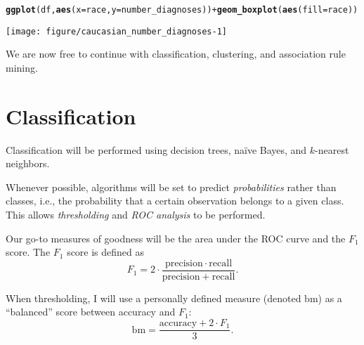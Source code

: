 \documentclass{article}\usepackage[]{graphicx}\usepackage[]{color}
\makeatletter
\def\maxwidth{ %
  \ifdim\Gin@nat@width>\linewidth
    \linewidth
  \else
    \Gin@nat@width
  \fi
}
\newcommand{\hlopt}[1]{\textcolor[rgb]{0,0,0}{#1}}%
\newcommand{\hlstd}[1]{\textcolor[rgb]{0.345,0.345,0.345}{#1}}%
\newcommand{\hlkwc}[1]{\textcolor[rgb]{0.333,0.667,0.333}{#1}}%
\newcommand{\hlkwd}[1]{\textcolor[rgb]{0.737,0.353,0.396}{\textbf{#1}}}%
\newenvironment{kframe}{%
 \def\at@end@of@kframe{}%
 \ifinner\ifhmode%
  \def\at@end@of@kframe{\end{minipage}}%
  \begin{minipage}{\columnwidth}%
 \fi\fi%
 \def\FrameCommand##1{\hskip\@totalleftmargin \hskip-\fboxsep
 \colorbox{shadecolor}{##1}\hskip-\fboxsep
     \hskip-\linewidth \hskip-\@totalleftmargin \hskip\columnwidth}%
 \MakeFramed {\advance\hsize-\width
   \@totalleftmargin\z@ \linewidth\hsize
   \@setminipage}}%
 {\par\unskip\endMakeFramed%
 \at@end@of@kframe}
\newenvironment{knitrout}{}{} %
\makeatother
\begin{document}
\begin{knitrout}
\color{fgcolor}\begin{kframe}
\begin{alltt}
\hlkwd{ggplot}\hlstd{(df,} \hlkwd{aes}\hlstd{(}\hlkwc{x}\hlstd{=race,} \hlkwc{y}\hlstd{=number_diagnoses))} \hlopt{+} \hlkwd{geom_boxplot}\hlstd{(}\hlkwd{aes}\hlstd{(}\hlkwc{fill}\hlstd{=race))}
\end{alltt}
\end{kframe}

{\centering \texttt{[image: figure/caucasian\_number\_diagnoses-1]} 

}



\end{knitrout}

We are now free to continue with classification, clustering, and association
rule mining.

\section{Classification}\label{sec:classify}

Classification will be performed using decision trees, naïve Bayes, and
$k$-nearest neighbors.

Whenever possible, algorithms will be set to predict \emph{probabilities} rather
than classes, i.e., the probability that a certain observation belongs to a
given class.  This allows \emph{thresholding} and \emph{ROC analysis} to be
performed.

Our go-to measures of goodness will be the area under the ROC curve and the
$F_1$ score.  The $F_1$ score is defined as
\begin{equation*}
  F_1 = 2 \cdot \frac{\mathrm{precision} \cdot
    \mathrm{recall}}{\mathrm{precision} + \mathrm{recall}}\text{.}
\end{equation*}

When thresholding, I will use a personally defined measure (denoted
$\mathrm{bm}$) as a ``balanced'' score between accuracy and $F_1$:
\begin{equation}\label{eq:bm}
  \mathrm{bm} = \frac{\mathrm{accuracy} + 2 \cdot F_1}{3}\text{.}
\end{equation}
\end{document}
